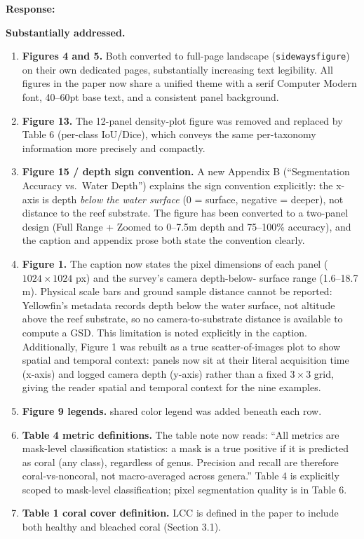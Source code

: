 \documentclass[12pt]{article}
\newenvironment{response}{%
  \vspace{4pt}%
  \color{respblue}%
  \noindent\textbf{Response:}\space
}{%
  \vspace{10pt}%
}
\begin{document}
\begin{response}
\textbf{Substantially addressed.}

\begin{enumerate}[topsep=2pt,itemsep=3pt]
  \item \textbf{Figures 4 and 5.}  Both converted to full-page landscape
    (\texttt{sidewaysfigure}) on their own dedicated pages, substantially
    increasing text legibility.  All figures in the paper now share a unified
    theme with a serif Computer Modern font, 40--60pt base
    text, and a consistent panel background.

  \item \textbf{Figure 13.}  The 12-panel density-plot figure was removed and
    replaced by Table 6 (per-class IoU/Dice), which conveys the same
    per-taxonomy information more precisely and compactly.

  \item \textbf{Figure 15 / depth sign convention.}  A new Appendix B
    (``Segmentation Accuracy vs.\ Water Depth'') explains the sign convention
    explicitly: the x-axis is depth \emph{below the water surface} (0 =
    surface, negative = deeper), not distance to the reef substrate.  The
    figure has been converted to a two-panel design (Full Range + Zoomed to
    0--7.5m depth and 75--100\% accuracy), and the caption and appendix prose
    both state the convention clearly.

  \item \textbf{Figure 1.}  The caption now states the pixel dimensions of
    each panel ($1024 \times 1024$ px) and the survey's camera depth-below-
    surface range (1.6--18.7 m).  Physical scale bars and ground sample
    distance cannot be reported: Yellowfin's metadata records depth below the
    water surface, not altitude above the reef substrate, so no
    camera-to-substrate distance is available to compute a GSD.  This
    limitation is noted explicitly in the caption.  Additionally, Figure 1 was
    rebuilt as a true scatter-of-images plot to show spatial and temporal context: panels now sit
    at their literal acquisition time (x-axis) and logged camera depth (y-axis)
    rather than a fixed $3\times3$ grid, giving the reader spatial and temporal
    context for the nine examples.

  \item \textbf{Figure 9 legends.}
    shared color legend was added beneath each row.

  \item \textbf{Table 4 metric definitions.}  The table note now reads: ``All
    metrics are mask-level classification statistics: a mask is a true positive
    if it is predicted as coral (any class), regardless of genus.  Precision
    and recall are therefore coral-vs-noncoral, not macro-averaged across
    genera.''  Table 4 is explicitly scoped to mask-level classification; pixel
    segmentation quality is in Table 6.

  \item \textbf{Table 1 coral cover definition.}  LCC is defined in the paper to include both healthy and bleached coral (Section 3.1).
\end{enumerate}
\end{response}
\end{document}
